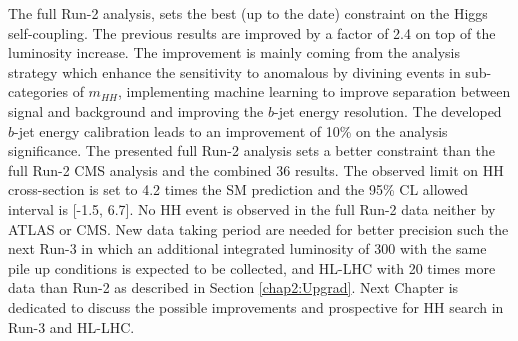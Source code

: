 The full Run-2 \HHyybb analysis, sets the best (up to the date) constraint on the Higgs self-coupling. The previous results are improved by a factor of 2.4 on top of the luminosity increase. The improvement is mainly coming from the analysis strategy which enhance the sensitivity to \kl anomalous by divining events in sub-categories of $m_{HH}$, implementing machine learning to improve separation between signal and background and improving the $b$-jet energy resolution. The developed $b$-jet energy calibration leads to an improvement of 10\% on the analysis significance. The presented full Run-2 \HHyybb analysis sets a better constraint than the full Run-2 CMS analysis and the combined 36 \ifb results. The observed limit on HH cross-section is set to 4.2 times the SM prediction and the 95\% CL allowed \kl interval is [-1.5, 6.7]. No HH event is observed in the full Run-2 data neither by ATLAS or CMS. New data taking period are needed for better precision such the next Run-3 in which an additional integrated luminosity of 300 \ifb with the same pile up conditions is expected to be collected, and HL-LHC with 20 times more data than Run-2 as described in Section \ref{chap2:Upgrad}. Next Chapter is dedicated to discuss the possible improvements and prospective for HH search in Run-3 and HL-LHC. 